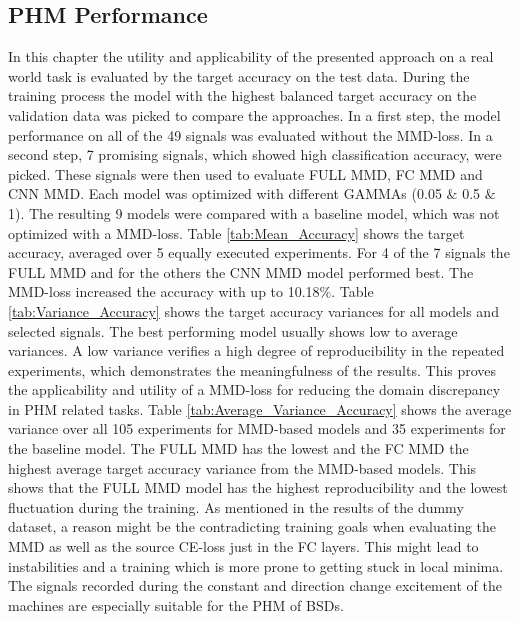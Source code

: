 \subsection{PHM Performance}\label{ch:PHM_performance}

In this chapter the utility and applicability of the presented approach on a real world task is evaluated by the target accuracy on the test data. During the training process the model with the highest balanced target accuracy on the validation data was picked to compare the approaches. In a first step, the model performance on all of the 49 signals was evaluated without the MMD-loss. In a second step, 7 promising signals, which showed high classification accuracy, were picked. These signals were then used to evaluate FULL MMD, FC MMD and CNN MMD. Each model was optimized with different GAMMAs (0.05 $\&$ 0.5 $\&$ 1). The resulting 9 models were compared with a baseline model, which was not optimized with a MMD-loss. Table \ref{tab:Mean_Accuracy} shows the target accuracy, averaged over 5 equally executed experiments. For 4 of the 7 signals the FULL MMD and for the others the CNN MMD model performed best. The MMD-loss increased the accuracy with up to 10.18$\%$. Table \ref{tab:Variance_Accuracy} shows the target accuracy variances for all models and selected signals. The best performing model usually shows low to average variances. A low variance verifies a high degree of reproducibility in the repeated experiments, which demonstrates the meaningfulness of the results. This proves the applicability and utility of a MMD-loss for reducing the domain discrepancy in PHM related tasks. Table \ref{tab:Average_Variance_Accuracy} shows the average variance over all 105 experiments for MMD-based models and 35 experiments for the baseline model. The FULL MMD has the lowest and the FC MMD the highest average target accuracy variance from the MMD-based models. This shows that the FULL MMD model has the highest reproducibility and the lowest fluctuation during the training. As mentioned in the results of the dummy dataset, a reason might be the contradicting training goals when evaluating the MMD as well as the source CE-loss just in the FC layers. This might lead to instabilities and a training which is more prone to getting stuck in local minima. The signals recorded during the constant and direction change excitement of the machines are especially suitable for the PHM of BSDs. 


